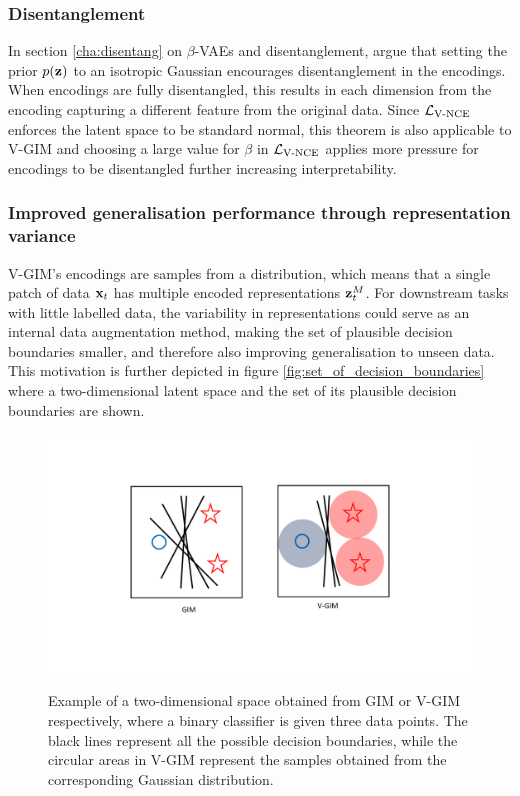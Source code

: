 						
	\subsubsection{Disentanglement}
		In section \ref{cha:disentang} on $\beta$-VAEs and disentanglement, \cite{higginsBetaVAELearningBasic2022} argue that setting the prior $p(\mathbf{z})$ to an isotropic Gaussian encourages disentanglement in the encodings. When encodings are fully disentangled, this results in each dimension from the encoding capturing a different feature from the original data. Since $\mathcal{L}_{\text{V-NCE}}$ enforces the latent space to be standard normal, this theorem is also applicable to V-GIM and choosing a large value for $\beta$ in $\mathcal{L}_{\text{V-NCE}}$ applies more pressure for encodings to be disentangled further increasing interpretability.
		
	
	\subsubsection{Improved generalisation performance through representation variance}
		V-GIM's encodings are samples from a distribution, which means that a single patch of data $\mathbf{x}_t$ has multiple encoded representations $\mathbf{z}_t^M$. For downstream tasks with little labelled data, the variability in representations could serve as an internal data augmentation method, making the set of plausible decision boundaries smaller, and therefore also improving generalisation to unseen data. This motivation is further depicted in figure \ref{fig:set_of_decision_boundaries} where a two-dimensional latent space and the set of its plausible decision boundaries are shown.
		
		\begin{figure}
			\centering
			\hspace*{1.5cm}
			\begin{annotatedFigure}
				{\includegraphics[width=0.8\linewidth, trim={5cm 4.5cm 0 4cm}, clip]{"graphs/linear boundary"} }	
			\end{annotatedFigure}
			\caption{Example of a two-dimensional space obtained from GIM or V-GIM respectively, where a binary classifier is given three data points. The black lines represent all the possible decision boundaries, while the circular areas in V-GIM represent the samples obtained from the corresponding Gaussian distribution.}
			\label{fig:architecture}
		\end{figure}
		
